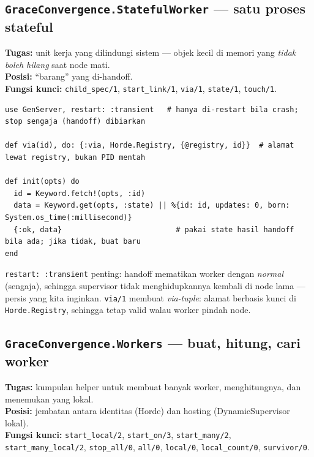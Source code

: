 \documentclass[11pt]{article}
\newcommand{\code}[1]{\texttt{\small #1}}
\begin{document}
\subsection{\texttt{GraceConvergence.StatefulWorker} --- satu proses stateful}
\textbf{Tugas:} unit kerja yang dilindungi sistem --- objek kecil di memori yang \emph{tidak boleh
hilang} saat node mati. \\
\textbf{Posisi:} ``barang'' yang di-handoff. \\
\textbf{Fungsi kunci:} \code{child\_spec/1}, \code{start\_link/1}, \code{via/1}, \code{state/1},
\code{touch/1}.
\begin{lstlisting}[style=ex]
use GenServer, restart: :transient   # hanya di-restart bila crash; stop sengaja (handoff) dibiarkan

def via(id), do: {:via, Horde.Registry, {@registry, id}}  # alamat lewat registry, bukan PID mentah

def init(opts) do
  id = Keyword.fetch!(opts, :id)
  data = Keyword.get(opts, :state) || %{id: id, updates: 0, born: System.os_time(:millisecond)}
  {:ok, data}                          # pakai state hasil handoff bila ada; jika tidak, buat baru
end
\end{lstlisting}
\code{restart: :transient} penting: handoff mematikan worker dengan \emph{normal} (sengaja), sehingga
supervisor tidak menghidupkannya kembali di node lama --- persis yang kita inginkan. \code{via/1}
membuat \emph{via-tuple}: alamat berbasis kunci di \code{Horde.Registry}, sehingga tetap valid walau
worker pindah node.

\subsection{\texttt{GraceConvergence.Workers} --- buat, hitung, cari worker}
\textbf{Tugas:} kumpulan helper untuk membuat banyak worker, menghitungnya, dan menemukan yang lokal. \\
\textbf{Posisi:} jembatan antara identitas (Horde) dan hosting (DynamicSupervisor lokal). \\
\textbf{Fungsi kunci:} \code{start\_local/2}, \code{start\_on/3}, \code{start\_many/2},
\code{start\_many\_local/2}, \code{stop\_all/0}, \code{all/0}, \code{local/0}, \code{local\_count/0},
\code{survivor/0}.
\end{document}
